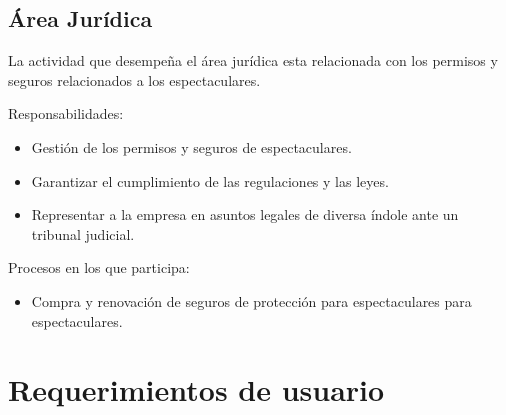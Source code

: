 \begin{Usuario}{\subsection{Área Jurídica}}{
La actividad que desempeña el área jurídica esta relacionada con los permisos y seguros relacionados a los espectaculares.
}
\item[Responsabilidades:]\cdtEmpty
\begin{itemize}
    \item Gestión de los permisos y seguros de espectaculares.
    \item Garantizar el cumplimiento de las regulaciones y las leyes.
    \item Representar a la empresa en asuntos legales de diversa índole ante un tribunal judicial.
\end{itemize}
\item[Procesos en los que participa:]\cdtEmpty
\begin{itemize}
    \item Compra y renovación de seguros de protección para espectaculares para espectaculares.
\end{itemize}
    
\end{Usuario}
\newpage

\section{Requerimientos de usuario}


